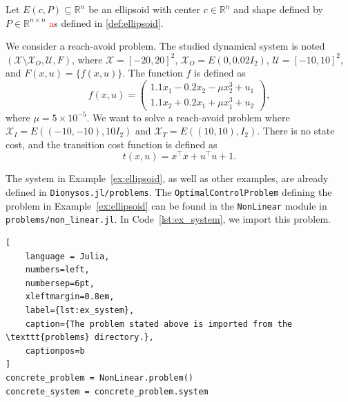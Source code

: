 \documentclass{juliacon}
\begin{document}
\begin{exam}\label{ex:ellipsoid}
Let $E(c, P) \subseteq \mathbb{R}^n$ be an ellipsoid with center $c \in \mathbb{R}^n$ and shape defined by $P \in \mathbb{R}^{n \times n}$ \textcolor{red}as defined in \ref{def:ellipsoid}.\color{black}

We consider a reach-avoid problem. The studied dynamical system is noted $(\mathcal{X} \setminus \mathcal{X}_O, \mathcal{U}, F)$, where $\mathcal{X} = [-20, 20]^2$, $\mathcal{X}_O = E(0, 0.02I_2)$, $\mathcal{U} = [-10, 10]^2$, and $F(x, u) = \{f(x, u)\}$. The function $f$ is defined as 
\begin{equation}
    f(x, u) = \begin{pmatrix}
        1.1x_1 - 0.2x_2 - \mu x_2^3 + u_1 \\
        1.1x_2 + 0.2x_1 + \mu x_1^3 + u_2
    \end{pmatrix}, 
\end{equation}
where $\mu = 5 \times 10^{-5}$. We want to solve a reach-avoid problem where $\mathcal{X}_I = E((-10, -10), 10I_2)$ and $\mathcal{X}_T = E((10, 10), I_2)$. There is no state cost, and the transition cost function is defined as 
\begin{equation}
    t(x, u) = x^\top x + u^\top u + 1.
\end{equation}
\end{exam}

\vskip 6pt

The system in Example~\ref{ex:ellipsoid}, as well as other examples, are already defined in \texttt{Dionysos.jl/problems}. The \texttt{OptimalControlProblem} defining the problem in Example~\ref{ex:ellipsoid} can be found in the \texttt{NonLinear} module in \texttt{problems/non\_linear.jl}. In Code~\ref{lst:ex_system}, we import this problem.
\begin{lstlisting}[
    language = Julia, 
    numbers=left, 
    numbersep=6pt,
    xleftmargin=0.8em,
    label={lst:ex_system}, 
    caption={The problem stated above is imported from the \texttt{problems} directory.},
    captionpos=b
]
concrete_problem = NonLinear.problem()
concrete_system = concrete_problem.system
\end{lstlisting}
\end{document}

